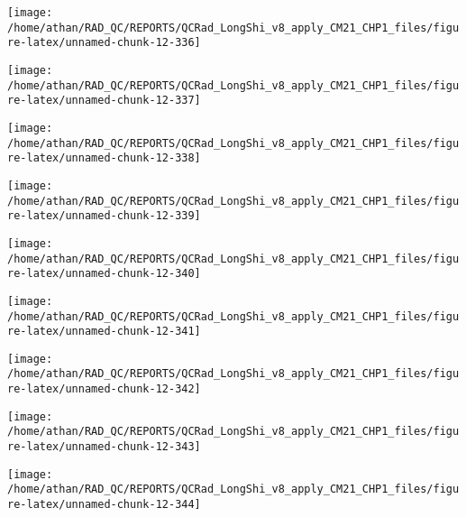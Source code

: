\documentclass[
  10pt,
  a4paper,oneside]{article}
\begin{document}
\begin{center}\texttt{[image: /home/athan/RAD\_QC/REPORTS/QCRad\_LongShi\_v8\_apply\_CM21\_CHP1\_files/figure-latex/unnamed-chunk-12-336]} \end{center}

\begin{center}\texttt{[image: /home/athan/RAD\_QC/REPORTS/QCRad\_LongShi\_v8\_apply\_CM21\_CHP1\_files/figure-latex/unnamed-chunk-12-337]} \end{center}

\begin{center}\texttt{[image: /home/athan/RAD\_QC/REPORTS/QCRad\_LongShi\_v8\_apply\_CM21\_CHP1\_files/figure-latex/unnamed-chunk-12-338]} \end{center}

\begin{center}\texttt{[image: /home/athan/RAD\_QC/REPORTS/QCRad\_LongShi\_v8\_apply\_CM21\_CHP1\_files/figure-latex/unnamed-chunk-12-339]} \end{center}

\begin{center}\texttt{[image: /home/athan/RAD\_QC/REPORTS/QCRad\_LongShi\_v8\_apply\_CM21\_CHP1\_files/figure-latex/unnamed-chunk-12-340]} \end{center}

\begin{center}\texttt{[image: /home/athan/RAD\_QC/REPORTS/QCRad\_LongShi\_v8\_apply\_CM21\_CHP1\_files/figure-latex/unnamed-chunk-12-341]} \end{center}

\begin{center}\texttt{[image: /home/athan/RAD\_QC/REPORTS/QCRad\_LongShi\_v8\_apply\_CM21\_CHP1\_files/figure-latex/unnamed-chunk-12-342]} \end{center}

\begin{center}\texttt{[image: /home/athan/RAD\_QC/REPORTS/QCRad\_LongShi\_v8\_apply\_CM21\_CHP1\_files/figure-latex/unnamed-chunk-12-343]} \end{center}

\begin{center}\texttt{[image: /home/athan/RAD\_QC/REPORTS/QCRad\_LongShi\_v8\_apply\_CM21\_CHP1\_files/figure-latex/unnamed-chunk-12-344]} \end{center}
\end{document}
